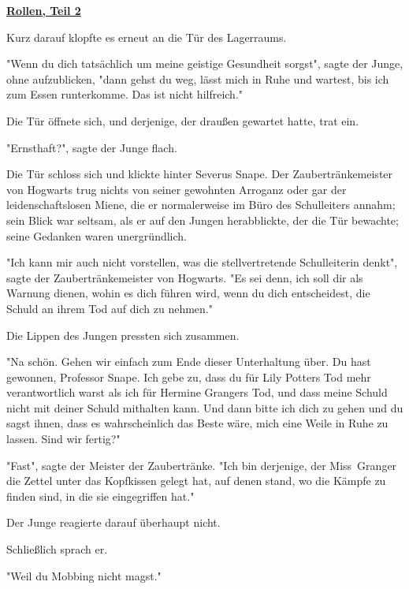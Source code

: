 

\hypertarget{rollen-teil-2}{%

\textbf{\uline{Rollen, Teil 2}}

Kurz darauf klopfte es erneut an die Tür des Lagerraums.

"Wenn du dich tatsächlich um meine geistige Gesundheit sorgst", sagte der Junge, ohne aufzublicken, "dann gehst du weg, lässt mich in Ruhe und wartest, bis ich zum Essen runterkomme. Das ist nicht hilfreich."

Die Tür öffnete sich, und derjenige, der draußen gewartet hatte, trat ein.

"Ernsthaft?", sagte der Junge flach.

Die Tür schloss sich und klickte hinter Severus Snape. Der Zaubertränkemeister von Hogwarts trug nichts von seiner gewohnten Arroganz oder gar der leidenschaftslosen Miene, die er normalerweise im Büro des Schulleiters annahm; sein Blick war seltsam, als er auf den Jungen herabblickte, der die Tür bewachte; seine Gedanken waren unergründlich.

"Ich kann mir auch nicht vorstellen, was die stellvertretende Schulleiterin denkt", sagte der Zaubertränkemeister von Hogwarts. "Es sei denn, ich soll dir als Warnung dienen, wohin es dich führen wird, wenn du dich entscheidest, die Schuld an ihrem Tod auf dich zu nehmen."

Die Lippen des Jungen pressten sich zusammen.

"Na schön. Gehen wir einfach zum Ende dieser Unterhaltung über. Du hast gewonnen, Professor Snape. Ich gebe zu, dass du für Lily Potters Tod mehr verantwortlich warst als ich für Hermine Grangers Tod, und dass meine Schuld nicht mit deiner Schuld mithalten kann. Und dann bitte ich dich zu gehen und du sagst ihnen, dass es wahrscheinlich das Beste wäre, mich eine Weile in Ruhe zu lassen. Sind wir fertig?"

"Fast", sagte der Meister der Zaubertränke. "Ich bin derjenige, der Miss~Granger die Zettel unter das Kopfkissen gelegt hat, auf denen stand, wo die Kämpfe zu finden sind, in die sie eingegriffen hat."

Der Junge reagierte darauf überhaupt nicht.

Schließlich sprach er.

"Weil du Mobbing nicht magst."

}
